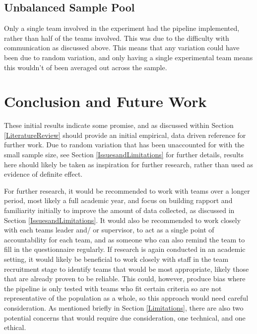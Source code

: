 \documentclass[journal]{IEEEtran}
\begin{document}
    \subsection{Unbalanced Sample Pool}
        Only a single team involved in the experiment had the pipeline implemented, rather than half of the teams involved. This was due to the difficulty with communication as discussed above. This means that any variation could have been due to random variation, and only having a single experimental team means this wouldn't of been averaged out across the sample.

\section{Conclusion and Future Work} \label{conclusion}
    These initial results indicate some promise, and as discussed within Section \ref{LiteratureReview} should provide an initial empirical, data driven reference for further work. Due to random variation that has been unaccounted for with the small sample size, see Section \ref{IssuesandLimitations} for further details, results here should likely be taken as inspiration for further research, rather than used as evidence of definite effect. 

    For further research, it would be recommended to work with teams over a longer period, most likely a full academic year, and focus on building rapport and familiarity initially to improve the amount of data collected, as discussed in Section \ref{IssuesandLimitations}. It would also be recommended to work closely with each teams leader and/ or supervisor, to act as a single point of accountability for each team, and as someone who can also remind the team to fill in the questionnaire regularly. If research is again conducted in an academic setting, it would likely be beneficial to work closely with staff in the team recruitment stage to identify teams that would be most appropriate, likely those that are already proven to be reliable. This could, however, produce bias where the pipeline is only tested with teams who fit certain criteria so are not representative of the population as a whole, so this approach would need careful consideration. As mentioned briefly in Section \ref{Limitations}, there are also two potential concerns that would require due consideration, one technical, and one ethical.
\end{document}
